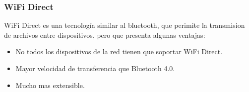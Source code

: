 \begin{frame}
  \frametitle{WiFi Direct}
  WiFi Direct es una tecnología similar al bluetooth, que perimite la transmision de archivos entre dispositivos, pero que presenta algunas ventajas:

  \begin{itemize}
    \pause
  \item No todos los dispositivos de la red tienen que soportar WiFi Direct.
    \pause
  \item Mayor velocidad de transferencia que Bluetooth 4.0.
    \pause
  \item Mucho mas extensible.
  \end{itemize}
\end{frame}
